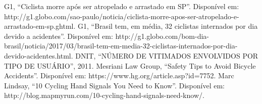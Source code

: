 \documentclass[conference]{IEEEtran}
\begin{document}
\begin{thebibliography}{00}
   G1, ``Ciclista morre após ser atropelado e arrastado em SP''. Disponível em: http://g1.globo.com/sao-paulo/noticia/ciclista-morre-apos-ser-atropelado-e-arrastado-em-sp.ghtml.
   G1, ``Brasil tem, em média, 32 ciclistas internados por dia devido a acidentes''. Disponível em: http://g1.globo.com/bom-dia-brasil/noticia/2017/03/brasil-tem-em-media-32-ciclistas-internados-por-dia-devido-acidentes.html.
   DNIT, ``NÚMERO DE VITIMADOS ENVOLVIDOS POR TIPO DE USUÁRIO'', 2011.
   Mesriani Law Group, ``Safety Tips to Avoid Bicycle Accidents''. Disponível em: https://www.hg.org/article.asp?id=7752.
   Marc Lindsay, ``10 Cycling Hand Signals You Need to Know''. Disponível em: http://blog.mapmyrun.com/10-cycling-hand-signals-need-know/.


\end{thebibliography}
\end{document}
